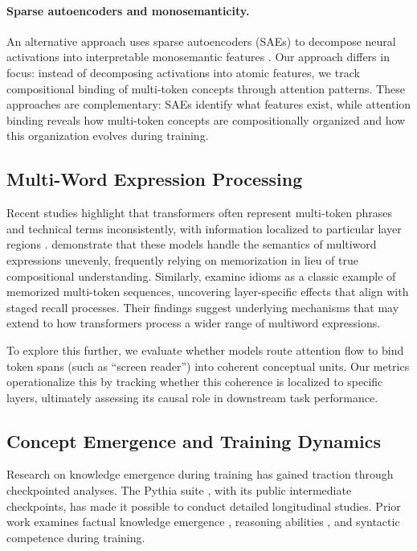 \documentclass[10pt]{article} %
\begin{document}
\paragraph{Sparse autoencoders and monosemanticity.}
An alternative approach uses sparse autoencoders (SAEs) to decompose neural activations into interpretable monosemantic features \citep{bricken2023monosemanticity,templeton2024monosemanticity}.
Our approach differs in focus: instead of decomposing activations into atomic features, we track compositional binding of multi-token concepts through attention patterns.
These approaches are complementary: SAEs identify what features exist, while attention binding reveals how multi-token concepts are compositionally organized and how this organization evolves during training.

\subsection{Multi-Word Expression Processing}

Recent studies highlight that transformers often represent multi-token phrases and technical terms inconsistently, with information localized to particular layer regions \citep{miletic2024semantics,haviv2023understanding}.
\citet{miletic2024semantics} demonstrate that these models handle the semantics of multiword expressions unevenly, frequently relying on memorization in lieu of true compositional understanding.
Similarly, \citet{haviv2023understanding} examine idioms as a classic example of memorized multi-token sequences, uncovering layer-specific effects that align with staged recall processes. Their findings suggest underlying mechanisms that may extend to how transformers process a wider range of multiword expressions.

To explore this further, we evaluate whether models route attention flow to bind token spans (such as ``screen reader'') into coherent conceptual units. Our metrics operationalize this by tracking whether this coherence is localized to specific layers, ultimately assessing its causal role in downstream task performance.

\subsection{Concept Emergence and Training Dynamics}

Research on knowledge emergence during training has gained traction through checkpointed analyses.
The Pythia suite \citep{biderman2023pythia}, with its public intermediate checkpoints, has made it possible to conduct detailed longitudinal studies.
Prior work examines factual knowledge emergence \citep{swayamdipta2020dataset}, reasoning abilities \citep{wei2022emergent}, and syntactic competence \citep{duan2025syntax} during training.
\end{document}

